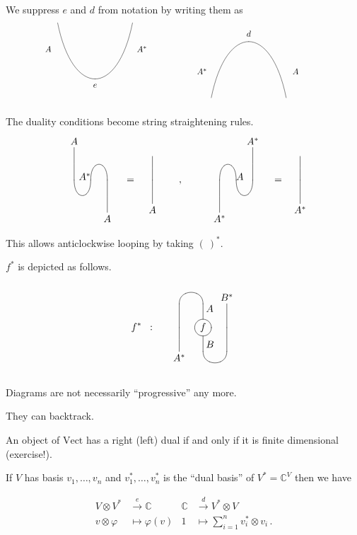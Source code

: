 \documentclass{beamer}
\newcommand{\lra}{\longrightarrow}
\begin{document}
\begin{frame}
We suppress $e$ and $d$ from notation by writing them as
%
\[ \kern-1cm
\xygraph{!{0;(-2.5,0):(0,1)::} [dd]*{}="l" [r] *{}="r" 
 "l"-@`{"l"+(.2,1),"r"+(-.2,1)}"r"|*++!U{e} 
"l" [l(.125)u(.35)] {A^*} "r" [r(.125)u(.35)] {A} 
}
\kern-3cm
\xygraph{!{0;(2.5,0):(0,1)::} [d] *{}="l" [r] *{}="r"
 "l"-@`{"l"+(.2,1),"r"+(-.2,1)}"r" |*++!D{d}
"l" [l(.125)u(.35)] {A^*} "r" [r(.125)u(.35)] {A}  
} 
\]
\end{frame}
\begin{frame}
The duality conditions become string straightening rules.
\[
\xygraph{ !{/r1.4pc/: /u2.75pc/::}
 []*+!D{A}
!{\xcapv-@(0)}
!{\vcap[-]}
[r] (?*!DR{A^*} , !{\vcap} )
[r] !{\xcapv-@(0)} *+!U{A}
} \quad = 
\xygraph{
!{/r1.3pc/: /u2pc/::}
!{\xcapv-@(0)}
!{\xcapv-@(0)} *+!U{A}
} \qquad,\qquad
\xygraph{ !{/r1.4pc/: /u2.75pc/::}
 [rr]*+!D{A^*}
  !{\xcapv-@(0)}
 [l] !{\vcap[-]}
 (?*!DL{A} ,  [l] !{\vcap} )
 [l] !{\xcapv-@(0)} *+!U{A^*}
} \quad = 
\xygraph{
!{/r1.3pc/: /u2pc/::}
!{\xcapv-@(0)}
!{\xcapv-@(0)} *+!U{A^*}
} \]

\end{frame}
\begin{frame}
This allows anticlockwise looping by taking $( \ )^\ast$.

$f^\ast$ is depicted as follows. 
\[ 
f^* \;\; : 
\xygraph{ !{/r2pc/: /u2pc/::}
 [rr]*+!D{B^*}
  !{\xcapv-@(0)} !{\xcapv-@(0)}
 [l] !{\vcap[-]} - [u]*+<8pt>[Fo]{f} _(.3)*{B}
 ( ?-[u]_(.8)*{A} [l] !{\vcap} )
 [lu] !{\xcapv-@(0)\xcapv-@(0)} *+!U{A^*}
} \]
%

Diagrams are not necessarily ``progressive''  any more.   

They can backtrack.
\end{frame}
\begin{frame}
\begin{example}
An object of $\mathrm{Vect} $ has a right (left) dual if and only if it is finite dimensional (exercise!). 
\bigskip

If $V$ has basis $v_1,\ldots,v_n$ and $v^\ast_1,\ldots,v^\ast_n$ is the ``dual basis'' of $V^\ast = \mathbb{C}^V$ then we have

\begin{align*}
 V \otimes V^\ast &\stackrel{e}{\lra} \mathbb{C}    
   & \mathbb{C}
     &\stackrel{d}{\lra}   V^\ast \otimes V  \\
  v \otimes \varphi &\longmapsto \varphi (v)   
   & 1 &\longmapsto \sum^n_{i=1} v^\ast_i \otimes v_i\,.
\end{align*}
\end{example}
\end{frame}
\end{document}
